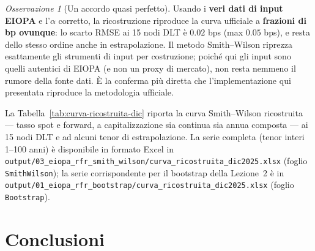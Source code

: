 \documentclass[11pt,a4paper]{article}
\theoremstyle{plain}
\theoremstyle{definition}
\theoremstyle{remark}
\newtheorem*{osservazione}{Osservazione}
\begin{document}
\begin{osservazione}[Un accordo quasi perfetto]
Usando i \textbf{veri dati di input EIOPA} e l'$\alpha$ corretto, la ricostruzione riproduce
la curva ufficiale a \textbf{frazioni di bp ovunque}: lo scarto RMSE ai 15 nodi DLT \`e
$0.02$ bps (max $0.05$ bps), e resta dello stesso ordine anche in estrapolazione. Il metodo
Smith--Wilson riprezza esattamente gli strumenti di input per costruzione; poich\'e qui gli
input sono quelli autentici di EIOPA (e non un proxy di mercato), non resta nemmeno il
rumore della fonte dati. \`E la conferma pi\`u diretta che l'implementazione qui presentata
riproduce la metodologia ufficiale.
\end{osservazione}

La Tabella~\ref{tab:curva-ricostruita-dic} riporta la curva Smith--Wilson ricostruita --- tasso
spot e forward, a capitalizzazione sia continua sia annua composta --- ai 15 nodi DLT e ad
alcuni tenor di estrapolazione. La serie completa (tenor interi 1--100 anni) \`e disponibile in
formato Excel in
\texttt{output/03\_eiopa\_rfr\_smith\_wilson/curva\_ricostruita\_dic2025.xlsx}
(foglio \texttt{SmithWilson}); la serie corrispondente per il bootstrap della Lezione~2 \`e in
\texttt{output/01\_eiopa\_rfr\_bootstrap/curva\_ricostruita\_dic2025.xlsx}
(foglio \texttt{Bootstrap}).



\section{Conclusioni}
\end{document}
